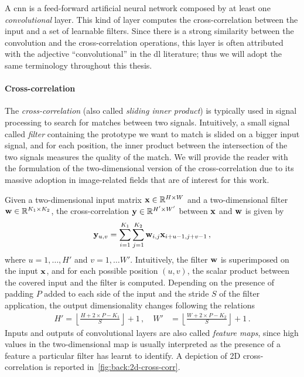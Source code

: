 A \gls{cnn} is a feed-forward artificial neural network composed by at least one \emph{convolutional} layer.
This kind of layer computes the cross-correlation between the input and a set of learnable filters.
Since there is a strong similarity between the convolution and the cross-correlation operations, this layer is often attributed with the adjective ``convolutional'' in the \gls{dl} literature;
thus we will adopt the same terminology throughout this thesis.

\paragraph{Cross-correlation}
The \emph{cross-correlation} (also called \emph{sliding inner product}) is typically used in signal processing to search for matches between two signals.
Intuitively, a small signal called \emph{filter} containing the prototype we want to match is slided on a bigger input signal, and for each position, the inner product between the intersection of the two signals measures the quality of the match.
We will provide the reader with the formulation of the two-dimensional version of the cross-correlation due to its massive adoption in image-related fields that are of interest for this work.

Given a two-dimensional input matrix $\mathbf{x} \in \mathbb{R}^{H \times W}$ and a two-dimensional filter $\mathbf{w} \in \mathbb{R}^{K_1 \times K_2}$, %
the cross-correlation $\mathbf{y} \in \mathbb{R}^{H' \times W'}$ between $\mathbf{x}$ and $\mathbf{w}$ is given by
%
\begin{equation}\label{eq:back:cross-correlation}
    \mathbf{y}_{u,v} = \sum_{i=1}^{K_1} \sum_{j=1}^{K_2} \mathbf{w}_{i,j} \mathbf{x}_{i+u-1,j+v-1} \,,
\end{equation}
%
where $u = 1, \dots, H'$ and $v = 1, \dots W'$.
Intuitively, the filter $\mathbf{w}$ is superimposed on the input $\mathbf{x}$, and for each possible position $(u,v)$, the scalar product between the covered input and the filter is computed.
Depending on the presence of padding $P$ added to each side of the input and the stride $S$ of the filter application, the output dimensionality changes following the relations
\begin{equation} \label{eq:back:conv-size}
\begin{split}
    H' = \left \lfloor \frac{H + 2 \times P - K_1}{S} \right \rfloor + 1 \,,\quad
    W' &= \left \lfloor \frac{W + 2 \times P - K_2}{S} \right \rfloor + 1 \,.
\end{split}
\end{equation}
Inputs and outputs of convolutional layers are also called \emph{feature maps}, since high values in the two-dimensional map is usually interpreted as the presence of a feature a particular filter has learnt to identify.
A depiction of 2D cross-correlation is reported in~\ref{fig:back:2d-cross-corr}.

